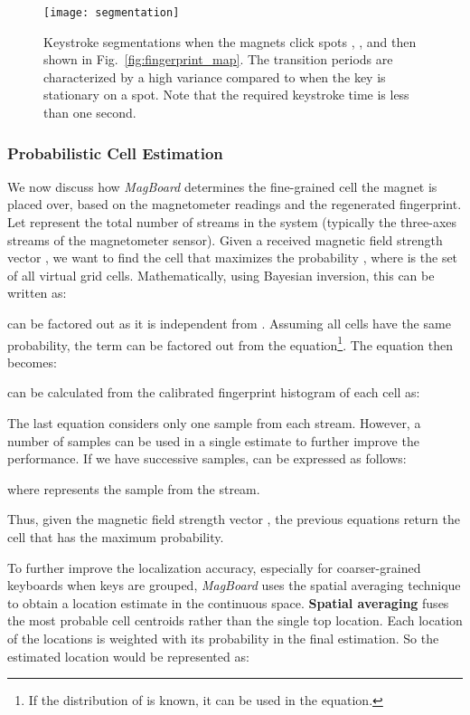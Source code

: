 \documentclass[conference]{IEEEtran}
\def \sys {\textit{MagBoard}}
\begin{document}
\begin{figure}[!t]
\centering
\texttt{[image: segmentation]}
\caption{Keystroke segmentations when the magnets click spots , , and then  shown in Fig.~\ref{fig:fingerprint_map}. The transition periods are characterized by a high variance compared to when the key is stationary on a spot. Note that the required keystroke time is less than one second. } 
\label{fig:segmintation}
\vspace{-0.2in}
\end{figure}

\subsubsection{Probabilistic Cell Estimation}
We now discuss how \sys{} determines the fine-grained cell the magnet is placed over, based on the magnetometer readings and the regenerated fingerprint. 
Let  represent the total number of streams in the system (typically the three-axes streams of the magnetometer sensor).  Given a received magnetic field strength vector , we want to find the cell  that maximizes the probability , where  is the set of all virtual grid cells. Mathematically, using Bayesian inversion, this can be written as:



 can be factored out as it is independent from . Assuming all cells have the same probability, the  term can be factored out from the equation\footnote{If the distribution of  is known, it can be used in the equation.}. The equation then becomes:


 can be calculated from the calibrated fingerprint histogram of each cell  as:


The last equation considers only one sample from each stream. However, a number of samples can be used in a single estimate to further improve the performance. If we have  successive samples,  can be expressed as follows:


where  represents the  sample from the  stream.

Thus, given the magnetic field strength vector , the previous equations return the cell  that has the maximum probability.

To further improve the localization accuracy, especially for coarser-grained keyboards when keys are grouped, \sys{} uses the spatial averaging technique to obtain a location estimate in the continuous space. \textbf{Spatial averaging} fuses the most probable  cell centroids rather than the single top location. Each location of the  locations is weighted with its probability in the final estimation. So the estimated location  would be represented as:
\end{document}
